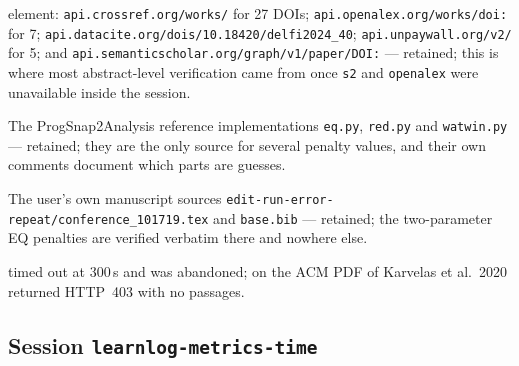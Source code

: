 \begin{description}
  element: \nolinkurl{api.crossref.org/works/} for 27 DOIs;
  \nolinkurl{api.openalex.org/works/doi:} for 7;
  \nolinkurl{api.datacite.org/dois/10.18420/delfi2024_40};
  \nolinkurl{api.unpaywall.org/v2/} for 5;
  and \nolinkurl{api.semanticscholar.org/graph/v1/paper/DOI:} ---
  retained; this is where most abstract-level verification came from once
  \texttt{s2} and \texttt{openalex} were unavailable inside the session.
\item[GitHub raw] The ProgSnap2Analysis reference implementations
  \texttt{eq.py}, \texttt{red.py} and \texttt{watwin.py} --- retained; they
  are the only source for several penalty values, and their own comments
  document which parts are guesses.
\item[Local first-party sources] The user's own manuscript sources
  \nolinkurl{edit-run-error-repeat/conference_101719.tex} and
  \texttt{base.bib} --- retained; the two-parameter EQ penalties are
  verified verbatim there and nowhere else.
\item[Failed tool invocations] 
  timed out at 300\,s and was abandoned;  on the
  ACM PDF of Karvelas et al.\ 2020 returned HTTP~403 with no passages.
\end{description}

\subsection{Session \texttt{learnlog-metrics-time}}

